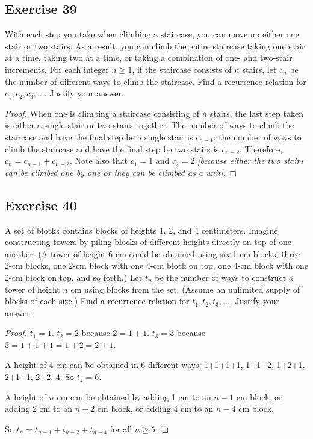 \documentclass[14pt]{extarticle}
\begin{document}
\subsection{Exercise 39}
With each step you take when climbing a staircase, you can move up either one stair or two stairs. As a result, you 
can climb the entire staircase taking one stair at a time, taking two at a time, or taking a combination of one- and 
two-stair increments. For each integer $n \geq 1$, if the staircase consists of $n$ stairs, let $c_n$ be the number 
of different ways to climb the staircase. Find a recurrence relation for $c_1, c_2, c_3, \ldots$. Justify your answer.

\begin{proof}
When one is climbing a staircase consisting of $n$ stairs, the last step taken is either a single stair or two stairs 
together. The number of ways to climb the staircase and have the final step be a single stair is $c_{n-1}$; the 
number of ways to climb the staircase and have the final step be two stairs is $c_{n-2}$. Therefore, \(c_n = c_{n-1} 
+ c_{n-2}\). Note also that $c_1 = 1$ and $c_2 = 2$ {\it [because either the two stairs can be climbed one by one or 
they can be climbed as a unit]}.
\end{proof}

\subsection{Exercise 40}
A set of blocks contains blocks of heights 1, 2, and 4 centimeters. Imagine constructing towers by piling blocks 
of different heights directly on top of one another. (A tower of height 6 cm could be obtained using six 1-cm 
blocks, three 2-cm blocks, one 2-cm block with one 4-cm block on top, one 4-cm block with one 2-cm block on top, 
and so forth.) Let $t_n$ be the number of ways to construct a tower of height $n$ cm using blocks from the set. (Assume 
an unlimited supply of blocks of each size.) Find a recurrence relation for $t_1, t_2, t_3, \ldots$. Justify your answer.

\begin{proof}
$t_1 = 1$. $t_2 = 2$ because $2 = 1+1$. $t_3 = 3$ because $3 = 1 + 1 + 1 = 1 + 2 = 2 + 1$.

A height of 4 cm can be obtained in 6 different ways: 1+1+1+1, 1+1+2, 1+2+1, 2+1+1, 2+2, 4. So $t_4 = 6$.

A height of $n$ cm can be obtained by adding 1 cm to an $n-1$ cm block, or adding 2 cm to an $n-2$ cm block, or
adding 4 cm to an $n-4$ cm block.

So \(t_{n} = t_{n-1} + t_{n-2} + t_{n-4}\) for all \(n \geq 5\).
\end{proof}
\end{document}
